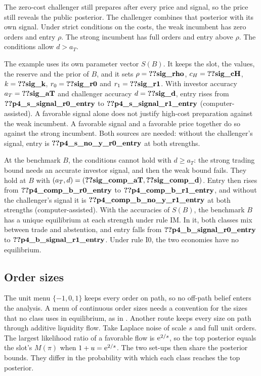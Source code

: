 The zero-cost challenger still
prepares after every price and signal, so the price still reveals the public posterior. The challenger combines that
posterior with its own signal. Under strict conditions on the costs, the weak incumbent has zero orders and entry
\(\rho\). The strong incumbent has full orders and entry above \(\rho\). The conditions allow \(d>a_T\).

The example uses its own parameter vector \(S(B)\). It keeps the slot, the values, the reserve and the prior of \(B\),
and it sets \(\rho=\reg{sig_rho}\), \(c_H=\reg{sig_cH}\), \(k=\reg{sig_k}\), \(r_0=\reg{sig_r0}\) and
\(r_1=\reg{sig_r1}\). With investor accuracy \(a_T=\reg{sig_aT}\) and challenger accuracy \(d=\reg{sig_d}\), entry
rises from \(\reg{p4_s_signal_r0_entry}\) to \(\reg{p4_s_signal_r1_entry}\) (computer-assisted). A favorable signal
alone does not justify high-cost preparation against the weak incumbent. A favorable signal and a favorable price
together do so against the strong incumbent. Both sources are needed: without the challenger's signal, entry is
\(\reg{p4_s_no_y_r0_entry}\) at both strengths.

At the benchmark \(B\), the conditions cannot hold with \(d\ge a_T\): the strong trading bound needs an accurate
investor signal, and then the weak bound fails. They hold at \(B\) with \((a_T,d)=(\reg{sig_comp_aT},\reg{sig_comp_d})\).
Entry then rises from \(\reg{p4_comp_b_r0_entry}\) to \(\reg{p4_comp_b_r1_entry}\), and without the challenger's signal
it is \(\reg{p4_comp_b_no_y_r1_entry}\) at both strengths (computer-assisted). With the accuracies of \(S(B)\), the
benchmark \(B\) has a unique equilibrium at each strength under rule IM. In it, both classes mix between trade and
abstention, and entry falls from \(\reg{p4_b_signal_r0_entry}\) to \(\reg{p4_b_signal_r1_entry}\). Under rule I0, the two
economies have no equilibrium.

\subsection{Order sizes}\label{sec:sizes}

\begin{remark}\label{rem:sizes}
The unit menu \(\{-1,0,1\}\) keeps every order on path, so no off-path belief enters the analysis. A menu of
continuous order sizes needs a convention for the sizes that no class uses in equilibrium, as in
\citet{EdmansGoldsteinJiang2015}. Another route keeps every size on path through additive liquidity flow. Take Laplace
noise of scale \(s\) and full unit orders. The largest likelihood ratio of a favorable flow is \(\mathrm{e}^{2/s}\), so the
top posterior equals the slot's \(M(\pi)\) when \(1+u=\mathrm{e}^{2/s}\). The two set-ups then share the posterior bounds.
They differ in the probability with which each class reaches the top posterior.
\end{remark}
